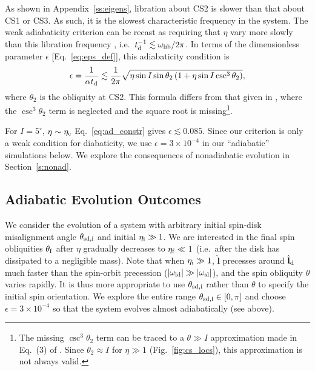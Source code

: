 \documentclass[
        fleqn,
        usenatbib,
    ]{mnras}
\newcommand*{\abs}[1]{\left|#1\right|}
\newcommand*{\bm}[1]{\boldsymbol{\mathbf{#1}}}
\newcommand*{\uv}[1]{\hat{\bm{#1}}}
\newcommand*{\p}[1]{\left(#1\right)}
\begin{document}
As shown in Appendix~\ref{ss:eigens}, libration about CS2 is slower than that
about CS1 or CS3. As such, it is the slowest characteristic frequency in the
system. The weak adiabaticity criterion can be recast as requiring that $\eta$
vary more slowly than this libration frequency
\citep[see][]{ward2004II,millholland_disk}, i.e.\ $t_{\rm d}^{-1} \lesssim
\omega_{\rm lib} / 2\pi$. In terms of the dimensionless parameter $\epsilon$
[Eq.~\eqref{eq:eps_def}], this adiabaticity condition is
\begin{equation}
    \epsilon = \frac{1}{\alpha t_{\rm d}}
        \lesssim \frac{1}{2\pi}\sqrt{\eta\sin I \sin \theta_2
            \p{1 + \eta \sin I \csc^3 \theta_2}},
            \label{eq:ad_constr}
\end{equation}
where $\theta_2$ is the obliquity at CS2. This formula differs from that given
in \citet{millholland_disk}, where the $\csc^3\theta_2$ term is neglected and
the square root is missing\footnote{The missing $\csc^3 \theta_2$ term can be
traced to a $\theta \gg I$ approximation made in Eq.~(3) of \citet{ward2004II}.
Since $\theta_2 \approx I$ for $\eta \gg 1$ (Fig.~\ref{fig:cs_locs}), this
approximation is not always valid.}.

For $I = 5^\circ$, $\eta \sim \eta_{\rm c}$ Eq.~\eqref{eq:ad_constr} gives
$\epsilon \lesssim 0.085$. Since our criterion is only a weak condition for
diabaticity, we use $\epsilon = 3 \times 10^{-4}$ in our ``adiabatic''
simulations below. We explore the consequences of nonadiabatic evolution in
Section~\ref{s:nonad}.

\subsection{Adiabatic Evolution Outcomes}\label{ss:ad_ensemble}

We consider the evolution of a system with arbitrary initial spin-disk
misalignment angle $\theta_{\rm sd, i}$ and initial $\eta_{\rm i} \gg 1$. We are
interested in the final spin obliquities $\theta_{\rm f}$ after $\eta$ gradually
decreases to $\eta_{\rm f} \ll 1$ (i.e.\ after the disk has dissipated to a
negligible mass). Note that when $\eta_{\rm i} \gg 1$, $\uv{l}$ precesses
around $\uv{l}_{\rm d}$ much faster than the spin-orbit precession
($\abs{\omega_{\rm ld}} \gg \abs{\omega_{\rm sl}}$), and the spin obliquity
$\theta$ varies rapidly. It is thus more appropriate to use $\theta_{\rm sd, i}$
rather than $\theta$ to specify the initial spin orientation. We explore the
entire range $\theta_{\rm sd, i} \in [0, \pi]$ and choose $\epsilon = 3 \times
10^{-4}$ so that the system evolves almost adiabatically (see above).
\end{document}
